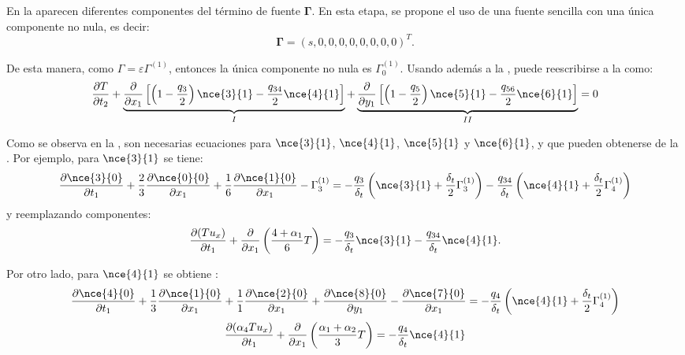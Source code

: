 En la  aparecen diferentes componentes del t\'ermino de fuente $\bm{\Gamma}$. En esta etapa, se propone el uso de una fuente sencilla con una \'unica componente no nula, es decir:
\begin{equation}
	\bm{\Gamma} = (s,0,0,0,0,0,0,0,0)^T.	
\end{equation}

De esta manera, como $\Gamma = \varepsilon \Gamma^{(1)}$, entonces la \'unica componente no nula es $\Gamma_0^{(1)}$. Usando adem\'as a la , puede reescribirse a la  como:
\begin{equation}
	\dfrac{\partial T}{\partial t_2} + 
	\underbrace{\dfrac{\partial}{\partial x_1}\left[ \left( 1-\dfrac{q_3}{2} \right) \nce{3}{1} - \dfrac{q_{34}}{2} \nce{4}{1} \right]}_{I} 	+  \underbrace{ \dfrac{\partial}{\partial y_1}\left[ \left( 1-\dfrac{q_5}{2} \right) \nce{5}{1} - \dfrac{q_{56}}{2}  \nce{6}{1} \right]}_{II} = 0	
	\label{eq:eps_2_reduced}
\end{equation}

Como se observa en la , son necesarias ecuaciones para $\nce{3}{1}$, $\nce{4}{1}$, $\nce{5}{1}$ y $\nce{6}{1}$, y que pueden obtenerse de la . Por ejemplo, para $\nce{3}{1}$ se tiene:
\begin{equation}
	\dfrac{\partial \nce{3}{0}}{\partial t_1} + \dfrac{2}{3}\dfrac{\partial \nce{0}{0}}{\partial x_1} + \dfrac{1}{6}\dfrac{\partial \nce{1}{0}}{\partial x_1} - \Gamma_3^{(1)} = -\dfrac{q_3}{\delta_t} \left( \nce{3}{1} +\dfrac{\delta_t}{2} \Gamma_3^{(1)}\right) - \dfrac{q_{34}}{\delta_t} \left( \nce{4}{1} +\dfrac{\delta_t}{2} \Gamma_4^{(1)}\right)
\end{equation}
y reemplazando componentes:
\begin{equation}
	\dfrac{\partial (Tu_x)}{\partial t_1} + \dfrac{\partial}{\partial x_1} \left(\dfrac{4+\alpha_1}{6} T \right) = -\dfrac{q_3}{\delta_t} \nce{3}{1} - \dfrac{q_{34}}{\delta_t} \nce{4}{1}.
	\label{eq:n3_2d}
\end{equation}

Por otro lado, para $\nce{4}{1}$ se obtiene :
\begin{equation}
	\dfrac{\partial \nce{4}{0}}{\partial t_1} + \dfrac{1}{3}\dfrac{\partial \nce{1}{0}}{\partial x_1} + \dfrac{1}{1}\dfrac{\partial \nce{2}{0}}{\partial x_1}  + \dfrac{\partial \nce{8}{0}}{\partial y_1} - \dfrac{\partial \nce{7}{0}}{\partial x_1}	
	= -\dfrac{q_4}{\delta_t} \left( \nce{4}{1} +\dfrac{\delta_t}{2} \Gamma_4^{(1)}\right)
\end{equation}
\begin{equation}
	\dfrac{\partial (\alpha_4 Tu_x)}{\partial t_1} + \dfrac{\partial}{\partial x_1} \left(\dfrac{\alpha_1 + \alpha_2}{3} T \right) = -\dfrac{q_4}{\delta_t} \nce{4}{1} 
	\label{eq:n4_2d}
\end{equation}

